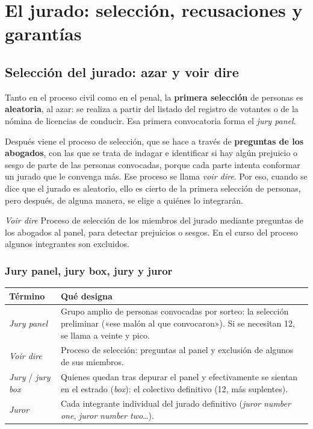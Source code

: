 \documentclass[12pt,oneside]{book}
\begin{document}
\chapter[El jurado]{El jurado: selección, recusaciones y garantías}

\section{Selección del jurado: azar y voir dire}

Tanto en el proceso civil como en el penal, la \textbf{primera selección} de personas es \textbf{aleatoria}, al azar: se realiza a partir del listado del registro de votantes o de la nómina de licencias de conducir. Esa primera convocatoria forma el \textit{jury panel}.

Después viene el proceso de selección, que se hace a través de \textbf{preguntas de los abogados}, con las que se trata de indagar e identificar si hay algún prejuicio o sesgo de parte de las personas convocadas, porque cada parte intenta conformar un jurado que le convenga más. Ese proceso se llama \textit{voir dire}. Por eso, cuando se dice que el jurado es aleatorio, ello es cierto de la primera selección de personas, pero después, de alguna manera, se elige a quiénes lo integrarán.

\begin{definition}{\textit{Voir dire}}
Proceso de selección de los miembros del jurado mediante preguntas de los abogados al panel, para detectar prejuicios o sesgos. En el curso del proceso algunos integrantes son excluidos.
\end{definition}

\subsection{Jury panel, jury box, jury y juror}

\begin{table}[H]
\centering
\begin{tabularx}{\textwidth}{P{3.4cm}L}
\toprule
\textbf{Término} & \textbf{Qué designa} \\
\midrule
\textit{Jury panel} & Grupo amplio de personas convocadas por sorteo: la selección preliminar («ese malón al que convocaron»). Si se necesitan 12, se llama a veinte y pico. \\
\textit{Voir dire} & Proceso de selección: preguntas al panel y exclusión de algunos de sus miembros. \\
\textit{Jury} / \textit{jury box} & Quienes quedan tras depurar el panel y efectivamente se sientan en el estrado (\textit{box}): el colectivo definitivo (12, más suplentes). \\
\textit{Juror} & Cada integrante individual del jurado definitivo (\textit{juror number one}, \textit{juror number two}\ldots). \\
\bottomrule
\end{tabularx}
\end{table}
\end{document}

